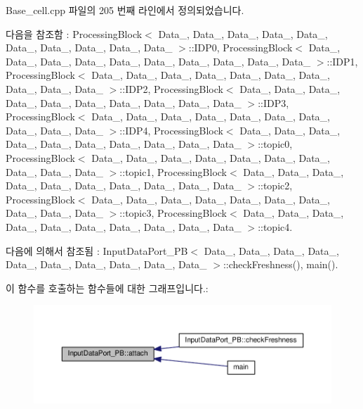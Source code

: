Base\+\_\+cell.\+cpp 파일의 205 번째 라인에서 정의되었습니다.



다음을 참조함 \+:  Processing\+Block$<$ Data\+\_, Data\+\_, Data\+\_, Data\+\_, Data\+\_, Data\+\_, Data\+\_, Data\+\_, Data\+\_, Data\+\_ $>$\+::\+I\+D\+P0, Processing\+Block$<$ Data\+\_, Data\+\_, Data\+\_, Data\+\_, Data\+\_, Data\+\_, Data\+\_, Data\+\_, Data\+\_, Data\+\_ $>$\+::\+I\+D\+P1, Processing\+Block$<$ Data\+\_, Data\+\_, Data\+\_, Data\+\_, Data\+\_, Data\+\_, Data\+\_, Data\+\_, Data\+\_, Data\+\_ $>$\+::\+I\+D\+P2, Processing\+Block$<$ Data\+\_, Data\+\_, Data\+\_, Data\+\_, Data\+\_, Data\+\_, Data\+\_, Data\+\_, Data\+\_, Data\+\_ $>$\+::\+I\+D\+P3, Processing\+Block$<$ Data\+\_, Data\+\_, Data\+\_, Data\+\_, Data\+\_, Data\+\_, Data\+\_, Data\+\_, Data\+\_, Data\+\_ $>$\+::\+I\+D\+P4, Processing\+Block$<$ Data\+\_, Data\+\_, Data\+\_, Data\+\_, Data\+\_, Data\+\_, Data\+\_, Data\+\_, Data\+\_, Data\+\_ $>$\+::topic0, Processing\+Block$<$ Data\+\_, Data\+\_, Data\+\_, Data\+\_, Data\+\_, Data\+\_, Data\+\_, Data\+\_, Data\+\_, Data\+\_ $>$\+::topic1, Processing\+Block$<$ Data\+\_, Data\+\_, Data\+\_, Data\+\_, Data\+\_, Data\+\_, Data\+\_, Data\+\_, Data\+\_, Data\+\_ $>$\+::topic2, Processing\+Block$<$ Data\+\_, Data\+\_, Data\+\_, Data\+\_, Data\+\_, Data\+\_, Data\+\_, Data\+\_, Data\+\_, Data\+\_ $>$\+::topic3, Processing\+Block$<$ Data\+\_, Data\+\_, Data\+\_, Data\+\_, Data\+\_, Data\+\_, Data\+\_, Data\+\_, Data\+\_, Data\+\_ $>$\+::topic4.



다음에 의해서 참조됨 \+:  Input\+Data\+Port\+\_\+\+P\+B$<$ Data\+\_, Data\+\_, Data\+\_, Data\+\_, Data\+\_, Data\+\_, Data\+\_, Data\+\_, Data\+\_, Data\+\_ $>$\+::check\+Freshness(), main().



이 함수를 호출하는 함수들에 대한 그래프입니다.\+:\nopagebreak
\begin{figure}[H]
\begin{center}
\leavevmode
\includegraphics[width=350pt]{classInputDataPort__PB_a1e2a0dd2fc47211496927695a511e1a5_icgraph}
\end{center}
\end{figure}


